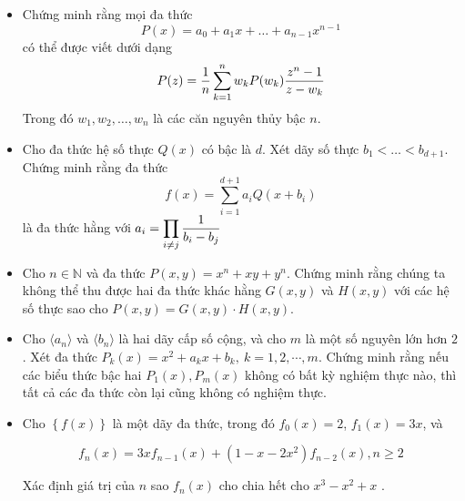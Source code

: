 \documentclass[11pt]{scrartcl}
\begin{document}
\begin{itemize}[label=, leftmargin=0em, itemsep=-0em]
        \item \begin{btvn}
            Chứng minh rằng mọi đa thức 
            \[
                P(x) = a_0 + a_1x +\dots + a_{n - 1}x^{n - 1}
            \]
            có thể được viết dưới dạng
            \[
                P(z) = \frac{1}{n}\dsum_{k = 1}^n w_kP(w_k) \frac{z^n - 1}{z - w_k}
            \]
            Trong đó $w_1,w_2,\dots, w_n$ là các căn nguyên thủy bậc $n$.
        \end{btvn}

        \item \begin{btvn}
            Cho đa thức hệ số thực $Q(x)$ có bậc là $d$. Xét dãy số thực $b_1 < \dots < b_{d + 1}$. Chứng minh rằng đa thức
            \[
                f(x) = \sum_{i = 1}^{d + 1}a_iQ(x + b_i)
            \]
            là đa thức hằng với $a_i = \dprod_{i \neq j}\frac{1}{b_i - b_j}$
        \end{btvn}

        \item \begin{btvn}
            Cho $n\in\mathbb N$ và đa thức $P(x,y)=x^n+xy+y^n.$
            Chứng minh rằng chúng ta không thể thu được hai đa thức khác hằng $G(x,y)$ và $H(x,y)$ với các hệ số thực sao cho
            $P(x,y)=G(x,y)\cdot H(x,y).$
        \end{btvn}

        \item \begin{btvn}
            Cho $\langle a_n\rangle $ và $ \langle b_n\rangle$ là hai dãy cấp số cộng, và cho $m$ là một số nguyên lớn hơn $ 2$. Xét đa thức $P_k(x)=x^2+a_kx+b_k,\ k=1,2,\cdots, m.$ Chứng minh rằng nếu các biểu thức bậc hai $P_1(x), P_m(x)$  không có bất kỳ nghiệm thực nào, thì tất cả các đa thức còn lại cũng không có nghiệm thực.
        \end{btvn}

        \item \begin{btvn}
            Cho ${\left\{ {f(x)} \right\}}$ là một dãy đa thức, trong đó ${f_0}(x) = 2$, ${f_1}(x) = 3x$, và

            $${f_n}(x) = 3x{f_{n - 1}}(x) + (1 - x - 2{x^2}){f_{n - 2}}(x),n \ge 2$$

            Xác định giá trị của $n$ sao ${f_n}(x)$ cho chia hết cho $x^3-x^2+x$ .
        \end{btvn}


\end{itemize}
\end{document}
